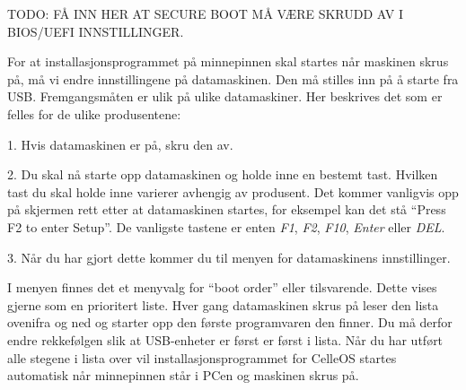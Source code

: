 TODO: FÅ INN HER AT SECURE BOOT MÅ VÆRE SKRUDD AV  I BIOS/UEFI INNSTILLINGER.

For at installasjonsprogrammet p\aa{} minnepinnen skal startes n\aa r maskinen skrus p\aa , m\aa{} vi endre innstillingene p\aa{} datamaskinen. Den m\aa{} stilles inn p\aa{} \aa{} starte fra USB. Fremgangsm\aa ten er ulik p\aa{} ulike datamaskiner. Her beskrives det som er felles for de ulike produsentene: 
\item{1.} Hvis datamaskinen er p\aa, skru den av.
\item{2.} Du skal n\aa{} starte opp datamaskinen og holde inne en bestemt tast. Hvilken tast du skal holde inne varierer avhengig av produsent. Det kommer vanligvis opp p\aa{} skjermen rett etter at datamaskinen startes, for eksempel kan det st\aa{} ``Press F2 to enter Setup''. De vanligste tastene er enten {\it F1}, {\it F2}, {\it F10}, {\it Enter} eller {\it DEL}.
\item{3.} N\aa r du har gjort dette kommer du til menyen for datamaskinens innstillinger. 
\medskip
{}
\item{} I menyen finnes det et menyvalg for ``boot order'' eller tilsvarende. Dette vises gjerne som en prioritert liste. Hver gang datamaskinen skrus p\aa{} leser den lista ovenifra og ned og starter opp den f\o rste programvaren den finner. Du m\aa{} derfor endre rekkef\o lgen slik at USB-enheter er f\o rst er f\o rst i lista.
\smallskip
\noindent N\aa r du har utf\o rt alle stegene i lista over vil installasjonsprogrammet for CelleOS startes automatisk n\aa r minnepinnen st\aa r i PCen og maskinen skrus p\aa.



